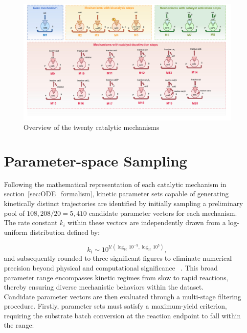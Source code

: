 \documentclass{dissertation}
\begin{document}
\begin{figure}[H]
    \centering
    \includegraphics[width=\textwidth]{data_generation/catalytic_mechanisms_types_M1_to_M20.pdf}
    \caption{Overview of the twenty catalytic mechanisms}
    \label{fig:catalytic_mechanisms_overview}
\end{figure}


\section{Parameter-space Sampling}
\label{sec:parameter_space_sampling}

Following the mathematical representation of each catalytic mechanism in section~\ref{sec:ODE_formalism}, kinetic parameter sets capable of generating kinetically distinct trajectories are identified by initially sampling a preliminary pool of $108{,}208 / 20 = 5{,}410$ candidate parameter vectors for each mechanism. The rate constant $k_i$ within these vectors are independently drawn from a log-uniform distribution defined by:

\begin{equation}
k_i \sim 10^{\mathcal{U}(\log_{10}10^{-5}, \log_{10}10^{5})},
\end{equation}
and subsequently rounded to three significant figures to eliminate numerical precision beyond physical and computational significance ~\cite{Novak2018}. This broad parameter range encompasses kinetic regimes from slow to rapid reactions, thereby ensuring diverse mechanistic behaviors within the dataset.\\

Candidate parameter vectors are then evaluated through a multi-stage filtering procedure. Firstly, parameter sets must satisfy a maximum-yield criterion, requiring the substrate batch conversion at the reaction endpoint to fall within the range:
\end{document}
